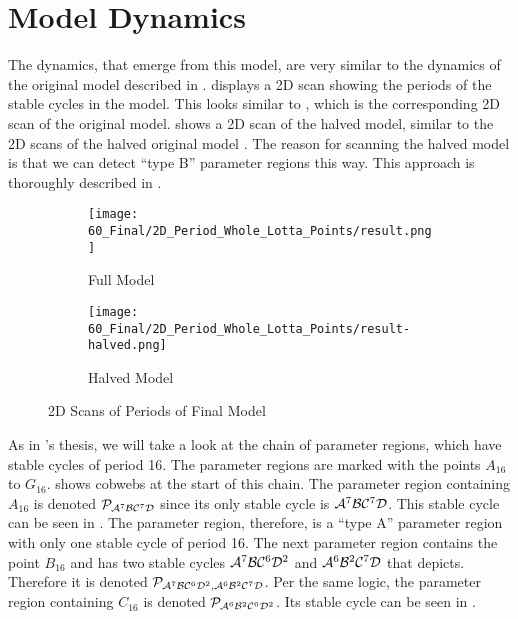 \section{Model Dynamics}

The dynamics, that emerge from this model, are very similar to the dynamics of the original model described in .
 displays a 2D scan showing the periods of the stable cycles in the model.
This looks similar to , which is the corresponding 2D scan of the original model.
 shows a 2D scan of the halved model, similar to the 2D scans of the halved original model .
The reason for scanning the halved model is that we can detect ``type B'' parameter regions this way.
This approach is thoroughly described in .

\begin{figure}
    \centering
    \begin{subfigure}{0.4\textwidth}
        \centering
        \texttt{[image: 60\_Final/2D\_Period\_Whole\_Lotta\_Points/result.png]}
        \caption{Full Model}
        \label{fig:final.period.whole.full}
    \end{subfigure}
    \begin{subfigure}{0.4\textwidth}
        \centering
        \texttt{[image: 60\_Final/2D\_Period\_Whole\_Lotta\_Points/result-halved.png]}
        \caption{Halved Model}
        \label{fig:final.period.whole.halved}
    \end{subfigure}
    \caption{2D Scans of Periods of Final Model}
\end{figure}

As in 's thesis, we will take a look at the chain of parameter regions, which have stable cycles of period 16.
The parameter regions are marked with the points $A_{16}$ to $G_{16}$.
 shows cobwebs at the start of this chain.
The parameter region containing $A_{16}$ is denoted $\mathcal{P}_{\mathcal{A}^7\mathcal{B}\mathcal{C}^7\mathcal{D}}$ since its only stable cycle is $\mathcal{A}^7\mathcal{B}\mathcal{C}^7\mathcal{D}$.
This stable cycle can be seen in .
The parameter region, therefore, is a ``type A'' parameter region with only one stable cycle of period 16.
The next parameter region contains the point $B_{16}$ and has two stable cycles $\mathcal{A}^7\mathcal{B}\mathcal{C}^6\mathcal{D}^2$ and $\mathcal{A}^6\mathcal{B}^2\mathcal{C}^7\mathcal{D}$ that  depicts.
Therefore it is denoted $\mathcal{P}_{\mathcal{A}^7\mathcal{B}\mathcal{C}^6\mathcal{D}^2, \mathcal{A}^6\mathcal{B}^2\mathcal{C}^7\mathcal{D}}$.
Per the same logic, the parameter region containing $C_{16}$ is denoted $\mathcal{P}_{\mathcal{A}^6\mathcal{B}^2\mathcal{C}^6\mathcal{D}^2}$.
Its stable cycle can be seen in .

